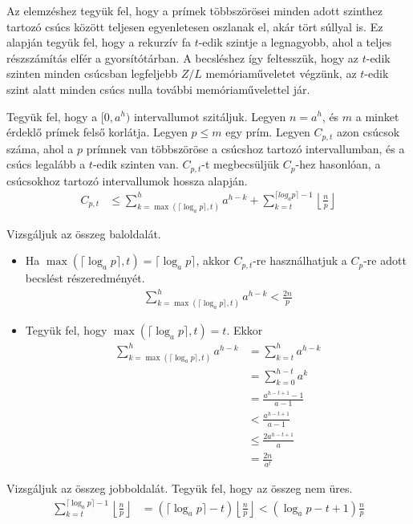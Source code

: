 \documentclass[12pt]{report}
\begin{document}
Az elemzéshez tegyük fel, hogy a prímek többszörösei minden adott szinthez
tartozó csúcs között teljesen egyenletesen oszlanak el,
akár tört súllyal is.
Ez alapján tegyük fel, hogy a rekurzív fa $t$-edik szintje
a legnagyobb, ahol a teljes részszámítás elfér a gyorsítótárban.
A becsléshez így feltesszük, hogy az $t$-edik szinten
minden csúcsban legfeljebb $Z/L$ memóriaműveletet végzünk,
az $t$-edik szint alatt minden csúcs nulla további memóriaművelettel jár.

Tegyük fel, hogy a $[0, a^h)$ intervallumot szitáljuk.
Legyen $n = a^h$, és $m$ a minket érdeklő prímek felső korlátja.
Legyen $p \le m$ egy prím.
Legyen $C_{p,t}$ azon csúcsok száma, ahol a $p$ prímnek van többszöröse
a csúcshoz tartozó intervallumban,
és a csúcs legalább a $t$-edik szinten van.
$C_{p,t}$-t megbecsüljük $C_p$-hez hasonlóan,
a csúcsokhoz tartozó intervallumok hossza alapján.
\begin{align*}
C_{p,t} &\le \sum_{k=\max(\lceil \log_{a}{p} \rceil,t)}^h a^{h-k}
+ \sum_{k=t}^{\lceil log_{a}{p} \rceil - 1} \left\lfloor \frac{n}{p} \right\rfloor
\end{align*}

Vizsgáljuk az összeg baloldalát.
\begin{itemize}
\item Ha $\max(\lceil \log_{a}{p} \rceil,t) = \lceil \log_{a}{p} \rceil$,
akkor $C_{p,t}$-re használhatjuk a $C_p$-re adott becslést részeredményét.
\begin{align*}
\sum_{k=\max(\lceil \log_{a}{p} \rceil,t)}^h a^{h-k}
< \frac{2n}{p}
\end{align*}

\item Tegyük fel, hogy $\max(\lceil \log_{a}{p} \rceil,t) = t$. Ekkor
\begin{align*}
\sum_{k=\max(\lceil \log_{a}{p} \rceil,t)}^h a^{h-k}
&= \sum_{k=t}^h a^{h-k} \\
&= \sum_{k=0}^{h-t} a^k \\
&= \frac{a^{h-t+1}-1}{a-1} \\
&< \frac{a^{h-t+1}}{a-1} \\
&\le \frac{2a^{h-t+1}}{a} \\
&= \frac{2n}{a^t}
\end{align*}
\end{itemize}

Vizsgáljuk az összeg jobboldalát. Tegyük fel, hogy az összeg nem üres.
\begin{align*}
\sum_{k=t}^{\lceil \log_{a}{p} \rceil - 1} \left\lfloor \frac{n}{p} \right\rfloor
&= (\lceil \log_{a}{p} \rceil - t) \left\lfloor \frac{n}{p} \right\rfloor
< (\log_{a}{p} - t + 1) \frac{n}{p}
\end{align*}
\end{document}
